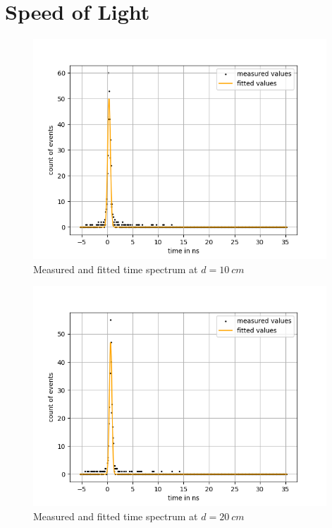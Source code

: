 \section{Speed of Light}
\label{chap:speedoflight}
\begin{figure}[H]
    \centering
    \includegraphics[width=110mm,scale=0.5]{Positronium/include/lightspeed fits1.png}
    \caption{Measured and fitted time spectrum at $d = \SI{10}{cm}$} 
    
\end{figure}
\begin{figure}[H]
    \centering
    \includegraphics[width=110mm,scale=0.5]{Positronium/include/lightspeed fits2.png}
    \caption{Measured and fitted time spectrum  at $d = \SI{20}{cm}$} 
   
\end{figure}

